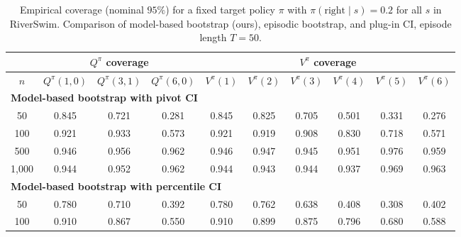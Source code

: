 \documentclass{article}
\numberwithin{equation}{section}
\begin{document}
\begin{table}[ht]
\centering
\caption{Empirical coverage (nominal $95\%$) for a fixed target policy $\pi$ with $\pi(\text{right}\mid s)=0.2$ for all $s$ in RiverSwim. Comparison of model-based bootstrap (ours), episodic bootstrap, and plug-in CI, episode length $T=50$.}
\label{tab:riverswim-mostly-left-coverage}
\begin{tabular}{c|ccc|cccccc}
\hline
& \multicolumn{3}{c|}{$Q^\pi$ coverage} & \multicolumn{6}{c}{$V^\pi$ coverage} \\ \hline
$n$
& $Q^\pi(1,0)$ & $Q^\pi(3,1)$ & $Q^\pi(6,0)$
& $V^\pi(1)$ & $V^\pi(2)$ & $V^\pi(3)$ & $V^\pi(4)$ & $V^\pi(5)$ & $V^\pi(6)$ \\
\hline
\multicolumn{10}{l}{\textbf{Model-based bootstrap with pivot CI}} \\ \hline
50
& \cellcolor{covheat!48!white}0.845 & 0.721 & 0.281
& \cellcolor{covheat!48!white}0.845 & \cellcolor{covheat!37!white}0.825 & 0.705 & 0.501 & 0.331 & 0.276 \\
100
& \cellcolor{covheat!86!white}0.921 & \cellcolor{covheat!92!white}0.933 & 0.573
& \cellcolor{covheat!86!white}0.921 & \cellcolor{covheat!85!white}0.919 & \cellcolor{covheat!79!white}0.908 & \cellcolor{covheat!40!white}0.830 & 0.718 & 0.571 \\
500
& \cellcolor{covheat!98!white}0.946 & \cellcolor{covheat!100!white}0.956 & \cellcolor{covheat!100!white}0.962
& \cellcolor{covheat!98!white}0.946 & \cellcolor{covheat!98!white}0.947 & \cellcolor{covheat!98!white}0.945 & \cellcolor{covheat!100!white}0.951 & \cellcolor{covheat!100!white}0.976 & \cellcolor{covheat!100!white}0.959 \\
1{,}000
& \cellcolor{covheat!97!white}0.944 & \cellcolor{covheat!100!white}0.952 & \cellcolor{covheat!100!white}0.962
& \cellcolor{covheat!97!white}0.944 & \cellcolor{covheat!96!white}0.943 & \cellcolor{covheat!97!white}0.944 & \cellcolor{covheat!94!white}0.937 & \cellcolor{covheat!100!white}0.969 & \cellcolor{covheat!100!white}0.963 \\
\hline
\multicolumn{10}{l}{\textbf{Model-based bootstrap with percentile CI}} \\ \hline
50
& \cellcolor{covheat!15!white}0.780 & 0.710 & 0.392
& \cellcolor{covheat!15!white}0.780 & \cellcolor{covheat!6!white}0.762 & 0.638 & 0.408 & 0.308 & 0.402 \\
100
& \cellcolor{covheat!80!white}0.910 & \cellcolor{covheat!59!white}0.867 & 0.550
& \cellcolor{covheat!80!white}0.910 & \cellcolor{covheat!75!white}0.899 & \cellcolor{covheat!63!white}0.875 & \cellcolor{covheat!23!white}0.796 & 0.680 & 0.588 \\

\end{tabular}
\end{table}
\end{document}
